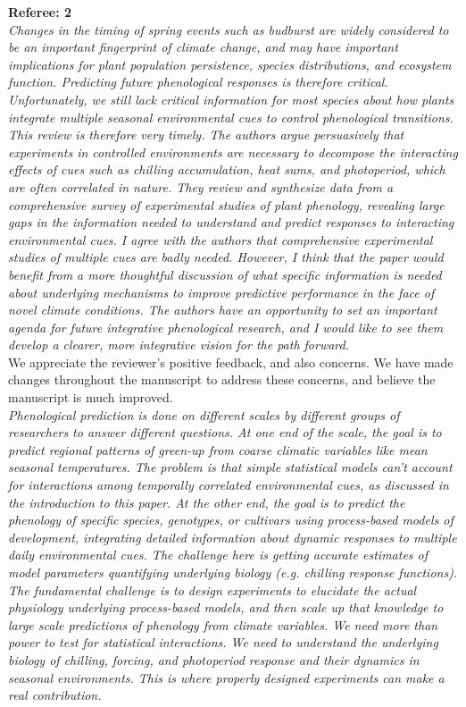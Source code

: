 \documentclass[11pt,letter]{article}
\begin{document}
{\bf Referee: 2}\\

\emph{Changes in the timing of spring events such as budburst are widely considered to be an important fingerprint of climate change, and may have important implications for plant population persistence, species distributions, and ecosystem function.   Predicting future phenological responses is therefore critical.  Unfortunately, we still lack critical information for most species about how plants integrate multiple seasonal environmental cues to control phenological transitions.  This review is therefore very timely.  The authors argue persuasively that experiments in controlled environments are necessary to decompose the interacting effects of cues such as chilling accumulation, heat sums, and photoperiod, which are often correlated in nature.  They review and synthesize data from a comprehensive survey of experimental studies of plant phenology, revealing large gaps in the information needed to understand and predict responses to interacting environmental cues.  I agree with the authors that comprehensive experimental studies of multiple cues are badly needed.   However, I think that the paper would benefit from a more thoughtful discussion of what specific information is needed about underlying mechanisms to improve predictive performance in the face of novel climate conditions. The authors have an opportunity to set an important agenda for future integrative phenological research, and I would like to see them develop a clearer, more integrative vision for the path forward.}\\

We appreciate the reviewer's positive feedback, and also concerns. We have made changes throughout the manuscript to address these concerns, and believe the manuscript is much improved. \\

\emph{Phenological prediction is done on different scales by different groups of researchers to answer different questions.  At one end of the scale, the goal is to predict regional patterns of green-up from coarse climatic variables like mean seasonal temperatures. The problem is that simple statistical models can’t account for interactions among temporally correlated environmental cues, as discussed in the introduction to this paper.  At the other end, the goal is to predict the phenology of specific species, genotypes, or cultivars using process-based models of development, integrating detailed information about dynamic responses to multiple daily environmental cues.   The challenge here is getting accurate estimates of model parameters quantifying underlying biology (e.g. chilling response functions).  The fundamental challenge is to design experiments to elucidate the actual physiology underlying process-based models, and then scale up that knowledge to large scale predictions of phenology from climate variables.  We need more than power to test for statistical interactions. We need to understand the underlying biology of chilling, forcing, and photoperiod response and their dynamics in seasonal environments. This is where properly designed experiments can make a real contribution.}\\
\end{document}
